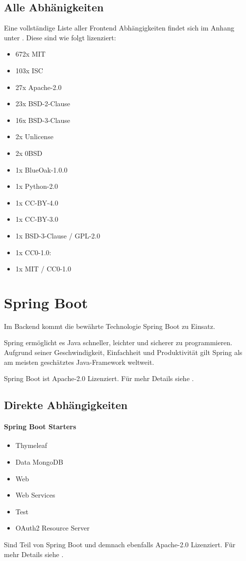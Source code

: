 \subsection{Alle Abhänigkeiten}
Eine vollständige Liste aller Frontend Abhängigkeiten findet sich im Anhang unter .
Diese sind wie folgt lizenziert:
\begin{itemize}
    \item 672x MIT
    \item 103x ISC
    \item 27x Apache-2.0
    \item 23x BSD-2-Clause
    \item 16x BSD-3-Clause
    \item 2x Unlicense
    \item 2x 0BSD
    \item 1x BlueOak-1.0.0
    \item 1x Python-2.0
    \item 1x CC-BY-4.0
    \item 1x CC-BY-3.0
    \item 1x BSD-3-Clause / GPL-2.0
    \item 1x CC0-1.0:
    \item 1x MIT / CC0-1.0
\end{itemize}



\section{Spring Boot}\label{sec:spring-boot}

Im Backend kommt die bewährte Technologie Spring Boot zu Einsatz.

Spring ermöglicht es Java schneller, leichter und sicherer zu programmieren.
Aufgrund seiner Geschwindigkeit, Einfachheit und Produktivität gilt Spring als am meisten geschätztes Java-Framework weltweit.
\cite{about-springboot}

Spring Boot ist Apache-2.0 Lizenziert.
Für mehr Details siehe .

\subsection{Direkte Abhängigkeiten}\label{subsec:direkte-abhanigkeiten}

\paragraph{Spring Boot Starters}
\begin{itemize}
    \item Thymeleaf
    \item Data MongoDB
    \item Web
    \item Web Services
    \item Test
    \item OAuth2 Resource Server
\end{itemize}
Sind Teil von Spring Boot und demnach ebenfalls Apache-2.0 Lizenziert.
Für mehr Details siehe .

